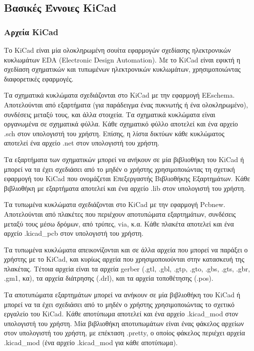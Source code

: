 \documentclass[a4paper]{article}
\begin{document}
\subsection{Βασικές Έννοιες KiCad}

\subsubsection{Αρχεία KiCad}
Το \textenglish{KiCad} είναι μία ολοκληρωμένη σουίτα εφαρμογών σχεδίασης ηλεκτρονικών κυκλωμάτων \textenglish{EDA (Electronic Design Automation)}. Με το \textenglish{KiCad} είναι εφικτή η σχεδίαση σχηματικών και τυπωμένων ηλεκτρονικών κυκλωμάτων, χρησιμοποιώντας διαφορετικές εφαρμογές.

Τα σχηματικά κυκλώματα σχεδιάζονται στο \textenglish{KiCad} με την εφαρμογή \textenglish{EEschema}. Αποτελούνται από εξαρτήματα (για παράδειγμα ένας πυκνωτής ή ένα ολοκληρωμένο), συνδέσεις μεταξύ τους, και άλλα στοιχεία. Τα σχηματικά κυκλώματα είναι οργανωμένα σε σχηματικά φύλλα. Κάθε σχηματικό φύλλο αποτελεί και ένα αρχείο .sch στον υπολογιστή του χρήστη. Επίσης, η λίστα δικτύων κάθε κυκλώματος αποτελεί ένα αρχείο .net στον υπολογιστή του χρήστη.

Τα εξαρτήματα των σχηματικών μπορεί να ανήκουν σε μία βιβλιοθήκη του \textenglish{KiCad} ή μπορεί να τα έχει σχεδιάσει από το μηδέν ο χρήστης χρησιμοποιώντας τη σχετική εφαρμογή του \textenglish{KiCad} που ονομάζεται Επεξεργαστής Βιβλιοθήκης Εξαρτημάτων. Κάθε βιβλιοθήκη με εξαρτήματα αποτελεί και ένα αρχείο .lib στον υπολογιστή του χρήστη.

Τα τυπωμένα κυκλώματα σχεδιάζονται στο \textenglish{KiCad} με την εφαρμογή Pcbnew. Αποτελούνται από πλακέτες που περιέχουν αποτυπώματα εξαρτημάτων, συνδέσεις μεταξύ τους μέσω δρόμων, από τρύπες, via, κ.α.
Κάθε πλακέτα αποτελεί και ένα αρχείο .kicad\_pcb στον υπολογιστή του χρήστη. 

Τα τυπωμένα κυκλώματα απεικονίζονται και σε άλλα αρχεία που μπορεί να παράξει ο χρήστης με το \textenglish{KiCad}, και κυρίως αρχεία που χρησιμοποιούνται στην κατασκευή της πλακέτας. Τέτοια αρχεία είναι τα αρχεία gerber (.gtl, .gbl, .gtp, .gto, .gbs, .gts, .gbr, .gm1, κα), τα αρχεία διάτρησης (.drl), και τα αρχεία τοποθέτησης (.pos).

Τα αποτυπώματα εξαρτημάτων μπορεί να ανήκουν σε μία βιβλιοθήκη του \textenglish{KiCad} ή μπορεί να τα έχει σχεδιάσει από το μηδέν ο χρήστης χρησιμοποιώντας το σχετικό εργαλείο του \textenglish{KiCad}. Κάθε αποτύπωμα αποτελεί και ένα αρχείο .kicad\_mod στον υπολογιστή του χρήστη. Μία βιβλιοθήκη αποτυπωμάτων είναι ένας φάκελος αρχείων στον υπολογιστή του χρήστη, με επέκταση .pretty, ο οποίος φάκελος περιέχει αρχεία .kicad\_mod (ένα αρχείο .kicad\_mod για κάθε αποτύπωμα).
\end{document}
